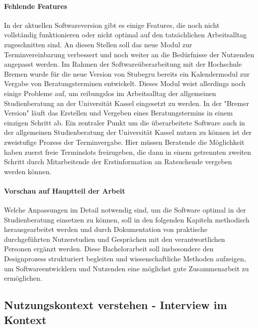 \paragraph{Fehlende Features}
In der aktuellen Softwareversion gibt es einige Features, die noch nicht
vollständig funktionieren oder nicht optimal auf den tatsächlichen
Arbeitsalltag zugeschnitten sind. An diesen Stellen soll das neue Modul zur
Terminvereinbarung verbessert und noch weiter an die Bedürfnisse der Nutzenden
angepasst werden. Im Rahmen der Softwareüberarbeitung mit der Hochschule Bremen
wurde für die neue Version von Stubegru bereits ein Kalendermodul zur Vergabe
von Beratungsterminen entwickelt. Dieses Modul weist allerdings noch einige
Probleme auf, um reibungslos im Arbeitsalltag der allgemeinen Studienberatung
an der Universität Kassel eingesetzt zu werden. In der "Bremer Version" läuft
das Erstellen und Vergeben eines Beratungstermins in einem einzigen Schritt ab.
Ein zentraler Punkt um die überarbeitete Software auch in der allgemeinen
Studienberatung der Universität Kassel nutzen zu können ist der zweistufige
Prozess der Terminvergabe. Hier müssen Beratende die Möglichkeit haben zuerst
freie Terminslots freizugeben, die dann in einem getrennten zweiten Schritt
durch Mitarbeitende der Erstinformation an Ratsuchende vergeben werden können.

\paragraph{Vorschau auf Hauptteil der Arbeit}
Welche Anpassungen im Detail notwendig sind, um die Software optimal in der
Studienberatung einsetzen zu können, soll in den folgenden Kapiteln methodisch
herausgearbeitet werden und durch Dokumentation von praktische durchgeführten
Nutzerstudien und Gesprächen mit den verantwortlichen Personen ergänzt werden.
Diese Bachelorarbeit soll insbesondere den Designprozess strukturiert begleiten
und wissenschaftliche Methoden aufzeigen, um Softwareentwicklern und Nutzenden
eine möglichst gute Zusammenarbeit zu ermöglichen.

\subsection{Nutzungskontext verstehen - Interview im Kontext}

